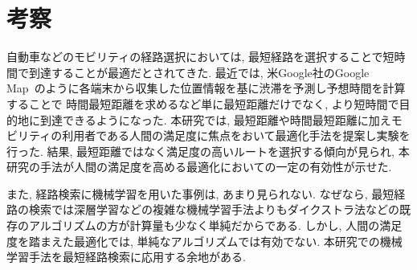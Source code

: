 \chapter{考察}
\label{consideration}

自動車などのモビリティの経路選択においては, 最短経路を選択することで短時間で到達することが最適だとされてきた.
最近では, 米Google社のGoogle Map~\cite{googlemap}のように各端末から収集した位置情報を基に渋滞を予測し予想時間を計算することで
時間最短距離を求めるなど単に最短距離だけでなく, より短時間で目的地に到達できるようになった.
本研究では, 最短距離や時間最短距離に加えモビリティの利用者である人間の満足度に焦点をおいて最適化手法を提案し実験を行った.
結果, 最短距離ではなく満足度の高いルートを選択する傾向が見られ, 本研究の手法が人間の満足度を高める最適化においての一定の有効性が示せた.

また, 経路検索に機械学習を用いた事例は, あまり見られない.
なぜなら, 最短経路の検索では深層学習などの複雑な機械学習手法よりもダイクストラ法などの既存のアルゴリズムの方が計算量も少なく単純だからである.
しかし, 人間の満足度を踏まえた最適化では, 単純なアルゴリズムでは有効でない. 本研究での機械学習手法を最短経路検索に応用する余地がある.
